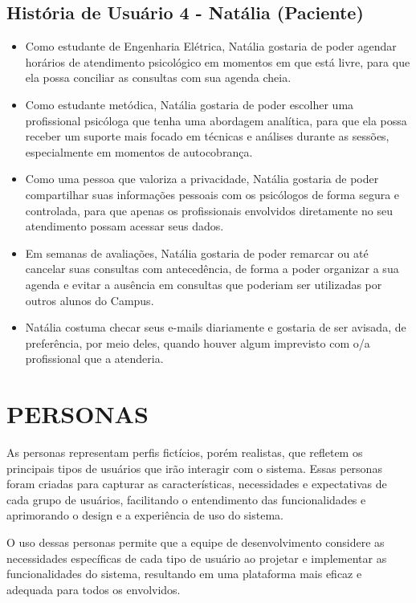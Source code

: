 \documentclass[a4paper,12pt]{report}
\begin{document}
\subsection{História de Usuário 4 - Natália (Paciente)}
\begin{itemize}
    \item Como estudante de Engenharia Elétrica, Natália gostaria de poder agendar horários de atendimento psicológico em momentos em que está livre, para que ela possa conciliar as consultas com sua agenda cheia.
    \item Como estudante metódica, Natália gostaria de poder escolher uma profissional psicóloga que tenha uma abordagem analítica, para que ela possa receber um suporte mais focado em técnicas e análises durante as sessões, especialmente em momentos de autocobrança.
    \item Como uma pessoa que valoriza a privacidade, Natália gostaria de poder compartilhar suas informações pessoais com os psicólogos de forma segura e controlada, para que apenas os profissionais envolvidos diretamente no seu atendimento possam acessar seus dados.
    \item Em semanas de avaliações, Natália gostaria de poder remarcar ou até cancelar suas consultas com antecedência, de forma a poder organizar a sua agenda e evitar a ausência em consultas que poderiam ser utilizadas por outros alunos do Campus.
    \item Natália costuma checar seus e-mails diariamente e gostaria de ser avisada, de preferência, por meio deles, quando houver algum imprevisto com o/a profissional que a atenderia.
\end{itemize}

\section{PERSONAS}
As personas representam perfis fictícios, porém realistas, que refletem os principais tipos de usuários que irão interagir com o sistema. Essas personas foram criadas para capturar as características, necessidades e expectativas de cada grupo de usuários, facilitando o entendimento das funcionalidades e aprimorando o design e a experiência de uso do sistema.


O uso dessas personas permite que a equipe de desenvolvimento considere as necessidades específicas de cada tipo de usuário ao projetar e implementar as funcionalidades do sistema, resultando em uma plataforma mais eficaz e adequada para todos os envolvidos.
\end{document}
